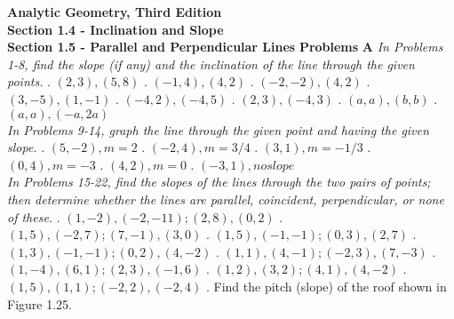 \documentclass[10pt,letterpaper]{article}
\begin{document}
\textbf{Analytic Geometry, Third Edition}\\
\textbf{Section 1.4 - Inclination and Slope}\\
\textbf{Section 1.5 - Parallel and Perpendicular Lines}
\newline \textbf{Problems}
\newline \textbf{A} \textit{In Problems 1-8, find the slope (if any) and the inclination of the line through the given points.}
. $(2,3),(5,8)$
. $(-1,4),(4,2)$
. $(-2,-2),(4,2)$
. $(3,-5),(1,-1)$
. $(-4,2),(-4,5)$
. $(2,3),(-4,3)$
. $(a,a), (b,b)$
. $(a,a), (-a,2a)$
\\
\newline \textit{In Problems 9-14, graph the line through the given point and having the given slope.}
. $(5,-2), m=2$
. $(-2,4), m=3/4$
. $(3,1), m= -1/3$
. $(0,4), m=-3$
. $(4,2), m=0$
. $(-3,1), no slope$
\\
\newline \textit{In Problems 15-22, find the slopes of the lines through the two pairs of points; then determine whether the lines are parallel, coincident, perpendicular, or none of these.}
. $(1,-2),(-2,-11); (2,8),(0,2)$
. $(1,5),(-2,7); (7,-1),(3,0)$
. $(1,5),(-1,-1); (0,3),(2,7)$
. $(1,3),(-1,-1); (0,2),(4,-2)$
. $(1,1),(4,-1); (-2,3),(7,-3)$
. $(1,-4),(6,1); (2,3),(-1,6)$
. $(1,2),(3,2); (4,1),(4,-2)$
. $(1,5),(1,1); (-2,2),(-2,4)$
. Find the pitch (slope) of the roof shown in Figure 1.25.
\end{document}
